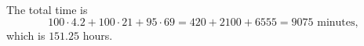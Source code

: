 The total time is
\[100\cdot4.2+100\cdot21+95\cdot69=420+2100+6555=\boxed{9075\text{ minutes}},\]
which is $151.25$ hours.
